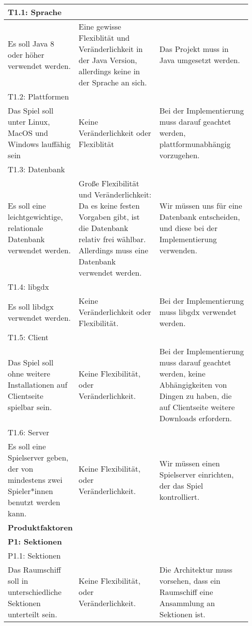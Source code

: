 \documentclass[fontsize=12pt,paper=a4,twoside]{scrartcl}
\begin{document}
\begin{longtable}[c]{|p{5cm}|p{5cm}|p{5cm}|}
\multicolumn{3}{|l|}{{T1.1: Sprache}} 
\\ \hline
Es soll Java 8 oder höher verwendet werden. & Eine gewisse Flexiblität und Veränderlichkeit in der Java Version, allerdings keine in der Sprache an sich.  & Das Projekt muss in Java umgesetzt werden. 
\\ \hline                 
\multicolumn{3}{|l|}{{T1.2: Plattformen}} 
\\ \hline
Das Spiel soll unter Linux, MacOS und Windows lauffähig sein & Keine Veränderlichkeit oder Flexiblität  & Bei der Implementierung muss darauf geachtet werden, plattformunabhängig vorzugehen. 
\\ \hline
\multicolumn{3}{|l|}{{T1.3: Datenbank}} 
\\ \hline
Es soll eine leichtgewichtige, relationale Datenbank verwendet werden. & Große Flexibilität und Veränderlichkeit: Da es keine festen Vorgaben gibt, ist die Datenbank relativ frei wählbar. Allerdings muss eine Datenbank verwendet werden. & Wir müssen uns für eine Datenbank entscheiden, und diese bei der Implementierung verwenden. 
\\ \hline
\multicolumn{3}{|l|}{{T1.4: libgdx}} 
\\ \hline
Es soll libdgx verwendet werden. & Keine Veränderlichkeit oder Flexibilität.   & Bei der Implementierung muss libgdx verwendet werden. 
\\ \hline
\multicolumn{3}{|l|}{{T1.5: Client}} 
\\ \hline
Das Spiel soll ohne weitere Installationen auf Clientseite spielbar sein. & Keine Flexibilität, oder Veränderlichkeit.    &  Bei der Implementierung muss darauf geachtet werden, keine Abhängigkeiten von Dingen zu haben, die auf Clientseite weitere Downloads erfordern. 
\\ \hline
\multicolumn{3}{|l|}{{T1.6: Server}} 
\\ \hline
Es soll eine Spielserver geben, der von mindestens zwei Spieler*innen benutzt werden kann. & Keine Flexibilität, oder Veränderlichkeit.    & Wir müssen einen Spielserver einrichten, der das Spiel kontrolliert. 
\\ \hline
\multicolumn{3}{|l|}{{\textbf{Produktfaktoren}}} 
\\ \hline
%
\multicolumn{3}{|l|}{{\textbf{P1: Sektionen}}} 
\\ \hline
\multicolumn{3}{|l|}{{P1.1: Sektionen}} 
\\ \hline
Das Raumschiff soll in unterschiedliche Sektionen unterteilt sein. & Keine Flexibilität, oder Veränderlichkeit.    & Die Architektur muss vorsehen, dass ein Raumschiff eine Ansammlung an Sektionen ist. 

\end{longtable}
\end{document}
